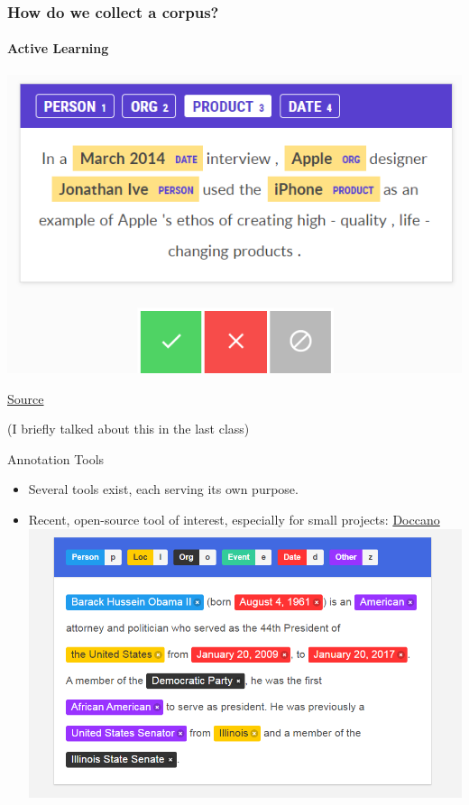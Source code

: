 \documentclass{beamer}
\begin{document}
\begin{frame}
\frametitle{How do we collect a corpus?}
\framesubtitle{Active Learning}
\includegraphics[width=\textwidth]{figures/prodigy.png}

\tiny \href{https://prodi.gy/}{Source}

(I briefly talked about this in the last class)
\end{frame}


\begin{frame}{Annotation Tools}
\begin{itemize}
    \item Several tools exist, each serving its own purpose. 
    \item Recent, open-source tool of interest, especially for small projects: \href{https://github.com/doccano/doccano}{Doccano}
    \includegraphics[width=\textwidth]{figures/Doccano.PNG}
\end{itemize}
    
\end{frame}
\end{document}

